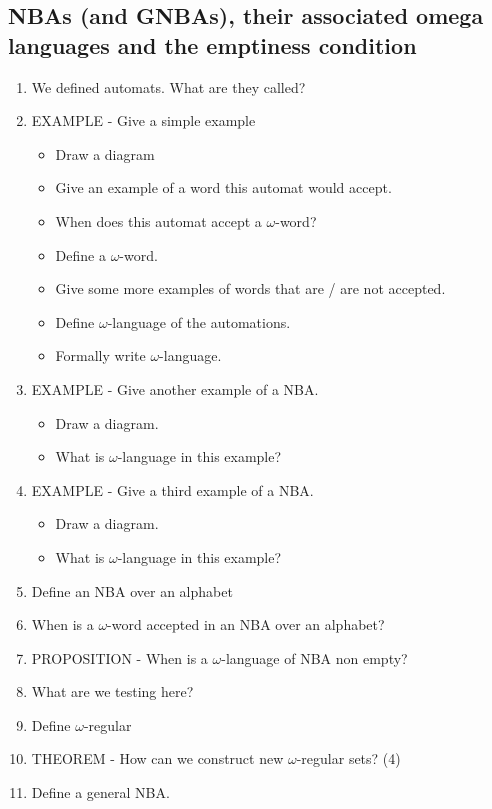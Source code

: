 \documentclass[fleqn]{article}
\begin{document}
\subsection{NBAs (and GNBAs), their associated omega languages and the emptiness condition}
\begin{enumerate}
    \item We defined automats. What are they called?
    \item EXAMPLE - Give a simple example
    \begin{itemize}
        \item Draw a diagram
        \item Give an example of a word this automat would accept.
        \item When does this automat accept a $\omega$-word?
        \item Define a $\omega$-word.
        \item Give some more examples of words that are / are not accepted.
        \item Define $\omega$-language of the automations.
        \item Formally write $\omega$-language.
    \end{itemize}
    \item EXAMPLE - Give another example of a NBA.
    \begin{itemize}
        \item Draw a diagram.
        \item What is $\omega$-language in this example?
    \end{itemize}
    \item EXAMPLE - Give a third example of a NBA.
    \begin{itemize}
        \item Draw a diagram.
        \item What is $\omega$-language in this example?
    \end{itemize}
    \item Define an NBA over an alphabet
    \item When is a $\omega$-word accepted in an NBA over an alphabet?
    \item PROPOSITION - When is a $\omega$-language of NBA non empty?
    \item What are we testing here?
    \item Define $\omega$-regular 
    \item THEOREM - How can we construct new $\omega$-regular sets? (4)
    \item Define a general NBA.

\end{enumerate}
\end{document}
